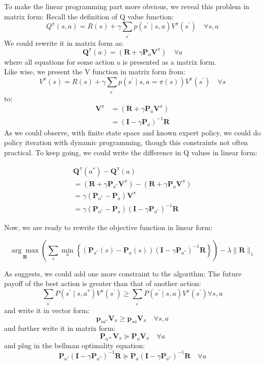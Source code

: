 \documentclass[11pt]{article}
\begin{document}
To make the linear programming part more obvious, we reveal this problem in matrix form:
Recall the definition of Q value function:
$$
Q^{\pi}(s, a)=R(s)+\gamma \sum_{s^{\prime}} p\left(s^{\prime} \mid s, a\right) V^{\pi}\left(s^{\prime}\right) \quad \forall s, a
$$
We could rewrite it in matrix form as:
$$
\mathbf{Q}^{\pi}(a)=\left(\mathbf{R}+\gamma \mathbf{P}_{a} \mathbf{V}^{\pi}\right) \quad \forall a
$$
where all equations for some action a is presented as a matrix form.\\

Like wise, we present the V function in matrix form from:
$$
V^{\pi}(s)=R(s)+\gamma \sum_{s^{\prime}} p\left(s^{\prime} \mid s, a=\pi(s)\right) V^{\pi}\left(s^{\prime}\right) \quad \forall s
$$
to:
$$
\begin{aligned}
\mathbf{V}^{\pi} &=\left(\mathbf{R}+\gamma \mathbf{P}_{a} \mathbf{V}^{\pi}\right) \\
 &=\left(\mathbf{I}-\gamma \mathbf{P}_{a}\right)^{-1} \mathbf{R}
\end{aligned}
$$
As we could observe, with finite state space and known expert policy, we could do policy iteration with dynamic programming, though this constraints not often practical. To keep going, we could write the difference in Q values in linear form:

$$
\begin{array}{l}
\mathbf{Q}^{\pi}\left(a^{*}\right)-\mathbf{Q}^{\pi}(a) \\
=\left(\mathbf{R}+\gamma \mathbf{P}_{a^{*}} \mathbf{V}^{\pi}\right)-\left(\mathbf{R}+\gamma \mathbf{P}_{a} \mathbf{V}^{\pi}\right) \\
=\gamma\left(\mathbf{P}_{a^{*}}-\mathbf{P}_{a}\right) \mathbf{V}^{\pi} \\
=\gamma\left(\mathbf{P}_{a^{*}}-\mathbf{P}_{a}\right)\left(\mathbf{I}-\gamma \mathbf{P}_{a^{*}}\right)^{-1} \mathbf{R}
\end{array}
$$

Now, we are ready to rewrite the objective function in linear form:

$$
\underset{\mathbf{R}}{\arg \max }\left(\sum_{s} \min _{a}\left\{\left(\mathbf{P}_{a^{*}}(s)-\mathbf{P}_{a}(s)\right)\left(\mathbf{I}-\gamma \mathbf{P}_{a^{*}}\right)^{-1} \mathbf{R}\right\}\right)-\lambda\|\mathbf{R}\|_{1}
$$

As \cite{ng2000algorithms} suggests, we could add one more constraint to the algorithm:
The future payoff of the best action is greater than that of another action:
$$
\sum_{s^{\prime}} P\left(s^{\prime} \mid s, a^{*}\right) V^{\pi}\left(s^{\prime}\right) \geq \sum_{s^{\prime}} P\left(s^{\prime} \mid s, a\right) V^{\pi}\left(s^{\prime}\right) \forall s, a
$$
and write it in vector form:
$$
\mathbf{p}_{s a^{*}} \mathbf{V}_{\pi} \geq \mathbf{p}_{s a} \mathbf{V}_{\pi} \quad \forall s, a
$$
and further write it in matrix form:
$$
\mathbf{P}_{a *} \mathbf{V}_{\pi} \succeq \mathbf{P}_{a} \mathbf{V}_{\pi} \quad \forall a
$$
and plug in the bellman optimality equation:
$$
\mathbf{P}_{a^{*}}\left(\mathbf{I}-\gamma \mathbf{P}_{a^{*}}\right)^{-1} \mathbf{R} \succeq \mathbf{P}_{a}\left(\mathbf{I}-\gamma \mathbf{P}_{a^{*}}\right)^{-1} \mathbf{R} \quad \forall a
$$
\end{document}
